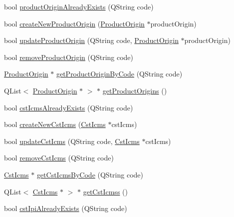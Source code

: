 \begin{DoxyCompactItemize}
\item 
bool \hyperlink{class_database_controller_afce9c192908ddd82b5d86d380ad765c9}{product\-Origin\-Already\-Exists} (\-Q\-String code)
\item 
bool \hyperlink{class_database_controller_a1073c86d3d7dcc26cf8a38b03a9fda76}{create\-New\-Product\-Origin} (\hyperlink{class_product_origin}{\-Product\-Origin} $\ast$product\-Origin)
\item 
bool \hyperlink{class_database_controller_a86974ac6f21f2429fb167f0d811e31e2}{update\-Product\-Origin} (\-Q\-String code, \hyperlink{class_product_origin}{\-Product\-Origin} $\ast$product\-Origin)
\item 
bool \hyperlink{class_database_controller_a9ae788eb6a00b517e2d093fa68197ebf}{remove\-Product\-Origin} (\-Q\-String code)
\item 
\hyperlink{class_product_origin}{\-Product\-Origin} $\ast$ \hyperlink{class_database_controller_a8e584db9e45bc18c4c8f2c5e4170f654}{get\-Product\-Origin\-By\-Code} (\-Q\-String code)
\item 
\-Q\-List$<$ \hyperlink{class_product_origin}{\-Product\-Origin} $\ast$ $>$ $\ast$ \hyperlink{class_database_controller_a4591da28f8eed152a84271e76e28d493}{get\-Product\-Origins} ()
\item 
bool \hyperlink{class_database_controller_acd947c01fd1478dd7938b68229811e08}{cst\-Icms\-Already\-Exists} (\-Q\-String code)
\item 
bool \hyperlink{class_database_controller_a686d0968468e51b698017b8d9e767b49}{create\-New\-Cst\-Icms} (\hyperlink{class_cst_icms}{\-Cst\-Icms} $\ast$cst\-Icms)
\item 
bool \hyperlink{class_database_controller_ae71d405e6bbff28a53f44d1919589a5f}{update\-Cst\-Icms} (\-Q\-String code, \hyperlink{class_cst_icms}{\-Cst\-Icms} $\ast$cst\-Icms)
\item 
bool \hyperlink{class_database_controller_a167550ee1bf1f223b97736fac20ebdba}{remove\-Cst\-Icms} (\-Q\-String code)
\item 
\hyperlink{class_cst_icms}{\-Cst\-Icms} $\ast$ \hyperlink{class_database_controller_a634d59dab209c83925f224f579682cd4}{get\-Cst\-Icms\-By\-Code} (\-Q\-String code)
\item 
\-Q\-List$<$ \hyperlink{class_cst_icms}{\-Cst\-Icms} $\ast$ $>$ $\ast$ \hyperlink{class_database_controller_ad2e597e343d29b5611a3597eed179433}{get\-Cst\-Icmss} ()
\item 
bool \hyperlink{class_database_controller_a7b4b39b7eff7597fb48ef8c7db8bc0c0}{cst\-Ipi\-Already\-Exists} (\-Q\-String code)

\end{DoxyCompactItemize}
